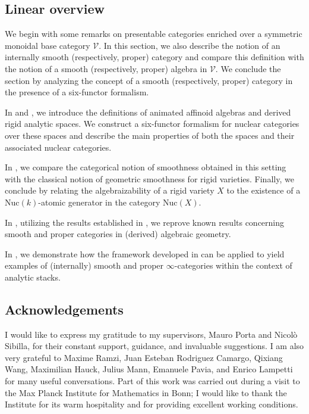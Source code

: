 \documentclass[oneside, hidelinks, 12pt, a4paper,reqno]{amsart}
\theoremstyle{plain}
\theoremstyle{definition}
\theoremstyle{plain}
\newcommand{\cates}{$\infty$-categories }
\newcommand{\Nuc}{\mathrm{Nuc}}
\begin{document}
\subsection{Linear overview}
We begin  with some remarks on presentable categories enriched over a symmetric monoidal base category $\mathscr{V}$. In this section, we also describe the notion of an internally smooth (respectively, proper) category and compare this definition with the notion of a smooth (respectively, proper) algebra in $\mathscr{V}$. We conclude the section by analyzing the concept of a smooth (respectively, proper) category in the presence of a six-functor formalism.

In  and , we introduce the definitions of animated affinoid algebras and derived rigid analytic spaces. We construct a six-functor formalism for nuclear categories over these spaces and describe the main properties of both the spaces and their associated nuclear categories.

In , we compare the categorical notion of smoothness obtained in this setting with the classical notion of geometric smoothness for rigid varieties. Finally, we conclude by relating the algebraizability of a rigid variety $X$ to the existence of a $\Nuc(k)$-atomic generator in the category $\Nuc(X)$.

In , utilizing the results established in , we reprove known results concerning smooth and proper categories in (derived) algebraic geometry.

In , we demonstrate how the framework developed in  can be applied to yield examples of (internally) smooth and proper \cates within the context of analytic stacks.

\subsection{Acknowledgements}
I would like to express my gratitude to my supervisors, Mauro Porta and Nicolò Sibilla, for their constant support, guidance, and invaluable suggestions. I am also very grateful to Maxime Ramzi, Juan Esteban Rodriguez Camargo, Qixiang Wang, Maximilian Hauck, Julius Mann, Emanuele Pavia, and Enrico Lampetti for many useful conversations. Part of this work was carried out during a visit to the Max Planck Institute for Mathematics in Bonn; I would like to thank the Institute for its warm hospitality and for providing excellent working conditions.
\end{document}
